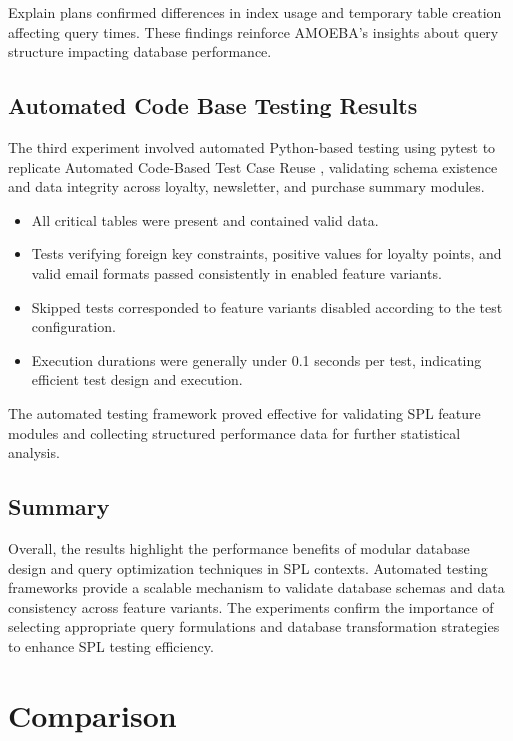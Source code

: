 Explain plans confirmed differences in index usage and temporary table creation affecting query times. These findings reinforce AMOEBA’s insights about query structure impacting database performance.

\subsection{Automated Code Base Testing Results}

The third experiment involved automated Python-based testing using pytest to replicate Automated Code-Based Test Case Reuse \cite{P1}, validating schema existence and data integrity across loyalty, newsletter, and purchase summary modules.

\begin{itemize}
    \item All critical tables were present and contained valid data.
    \item Tests verifying foreign key constraints, positive values for loyalty points, and valid email formats passed consistently in enabled feature variants.
    \item Skipped tests corresponded to feature variants disabled according to the test configuration.
    \item Execution durations were generally under 0.1 seconds per test, indicating efficient test design and execution.
\end{itemize}

The automated testing framework proved effective for validating SPL feature modules and collecting structured performance data for further statistical analysis.

\subsection{Summary}

Overall, the results highlight the performance benefits of modular database design and query optimization techniques in SPL contexts. Automated testing frameworks provide a scalable mechanism to validate database schemas and data consistency across feature variants. The experiments confirm the importance of selecting appropriate query formulations and database transformation strategies to enhance SPL testing efficiency.



\section{Comparison}
\label{sec:ch4_comparison}

